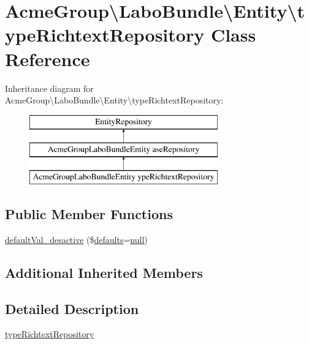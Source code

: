 \hypertarget{class_acme_group_1_1_labo_bundle_1_1_entity_1_1type_richtext_repository}{\section{Acme\+Group\textbackslash{}Labo\+Bundle\textbackslash{}Entity\textbackslash{}type\+Richtext\+Repository Class Reference}
\label{class_acme_group_1_1_labo_bundle_1_1_entity_1_1type_richtext_repository}
}
Inheritance diagram for Acme\+Group\textbackslash{}Labo\+Bundle\textbackslash{}Entity\textbackslash{}type\+Richtext\+Repository\+:\begin{figure}[H]
\begin{center}
\leavevmode
\includegraphics[height=3.000000cm]{class_acme_group_1_1_labo_bundle_1_1_entity_1_1type_richtext_repository}
\end{center}
\end{figure}
\subsection*{Public Member Functions}
\begin{DoxyCompactItemize}
\item 
\hyperlink{class_acme_group_1_1_labo_bundle_1_1_entity_1_1type_richtext_repository_a0c3b331d271416ae0a53d62bca663440}{default\+Val\+\_\+desactive} (\$\hyperlink{model_8defaults_8js_a9114d742403a54e409eca2e2c78bff56}{defaults}=\hyperlink{validate_8js_afb8e110345c45e74478894341ab6b28e}{null})
\end{DoxyCompactItemize}
\subsection*{Additional Inherited Members}


\subsection{Detailed Description}
\hyperlink{class_acme_group_1_1_labo_bundle_1_1_entity_1_1type_richtext_repository}{type\+Richtext\+Repository}

